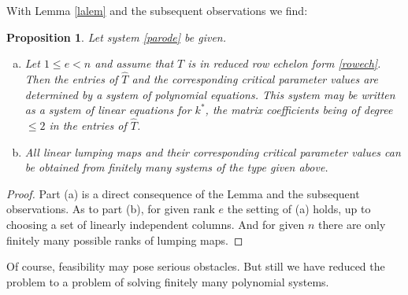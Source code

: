 \documentclass{article}
\newtheorem{proposition}{Proposition}
\begin{document}
With Lemma \ref{lalem} and the subsequent observations we find:
\begin{proposition}\label{algocrit} Let system \eqref{parode} be given.
\begin{enumerate}[(a)]
    \item  Let $1\leq e<n$ and assume that $T$ is in reduced row echelon form \eqref{rowech}. Then the entries of $\widehat T$ and the corresponding critical parameter values are determined by a system of polynomial equations. This system may be written as a system of linear equations for $k^*$, the matrix coefficients being of degree $\leq 2$ in the entries of $\widehat T$.
    \item All linear lumping maps and their corresponding critical parameter values can be obtained from finitely many systems of the type given above.
\end{enumerate}
\end{proposition}
\begin{proof}
    Part (a) is a direct consequence of the Lemma and the subsequent observations. As to part (b), for given rank $e$ the setting of (a) holds, up to choosing a set of linearly independent columns. And for given $n$ there are only finitely many possible ranks of lumping maps.
    \end{proof}
    Of course, feasibility may pose serious obstacles. But still we have reduced the problem to a problem of solving finitely many polynomial systems.
\end{document}
